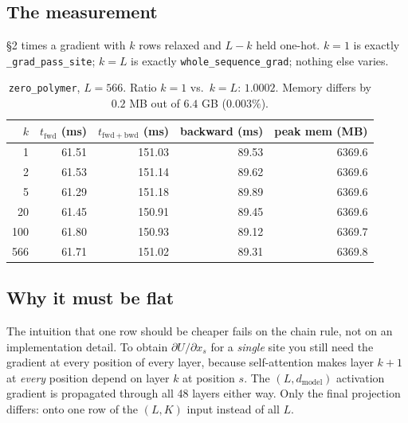 \documentclass[11pt,a4paper]{article}
\begin{document}
\subsection{The measurement}

 §2 times a gradient with $k$ rows
relaxed and $L-k$ held one-hot. $k=1$ is exactly \texttt{\_grad\_pass\_site};
$k=L$ is exactly \texttt{whole\_sequence\_grad}; nothing else varies.

\begin{table}[htbp]
\centering
\small
\begin{tabular}{r r r r r}
\toprule
$k$ & $t_{\mathrm{fwd}}$ (ms) & $t_{\mathrm{fwd+bwd}}$ (ms)
    & backward (ms) & peak mem (MB) \\
\midrule
1   & 61.51 & 151.03 & 89.53 & 6369.6 \\
2   & 61.53 & 151.14 & 89.62 & 6369.6 \\
5   & 61.29 & 151.18 & 89.89 & 6369.6 \\
20  & 61.45 & 150.91 & 89.45 & 6369.6 \\
100 & 61.80 & 150.93 & 89.12 & 6369.7 \\
566 & 61.71 & 151.02 & 89.31 & 6369.8 \\
\bottomrule
\end{tabular}
\caption{\texttt{zero\_polymer}, $L=566$. Ratio $k{=}1$ vs.\ $k{=}L$:
$1.0002$. Memory differs by $0.2$ MB out of $6.4$ GB ($0.003\%$).}
\label{tab:cost}
\end{table}

\subsection{Why it must be flat}

The intuition that one row should be cheaper fails on the chain rule, not on
an implementation detail. To obtain $\partial U/\partial x_{s}$ for a
\emph{single} site you still need the gradient at every position of every
layer, because self-attention makes layer $k{+}1$ at \emph{every} position
depend on layer $k$ at position $s$. The $(L, d_{\mathrm{model}})$ activation
gradient is propagated through all 48 layers either way. Only the final
projection differs: onto one row of the $(L,K)$ input instead of all $L$.
\end{document}
